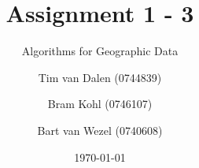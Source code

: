 \documentclass{beamer}
\title{Assignment 1 -  3}
\subtitle{Algorithms for Geographic Data}
\author[Dalen, Kohl, Wezel]{
	Tim van Dalen (0744839)
	\and
	Bram Kohl (0746107)
	\and
	Bart van Wezel (0740608)
}
\institute[Eindhoven University of Technology] %
{
    WIS\\
	Eindhoven University of Technology
}
\date{\today}
\begin{document}
	\begin{frame}
		\titlepage
	\end{frame}
	
	\begin{frame}
		\centering
		\def\svgwidth{0.7\textwidth}
		
	\end{frame}
	
	\begin{frame}
		\centering
		\def\svgwidth{0.7\textwidth}
		
	\end{frame}
\end{document}
